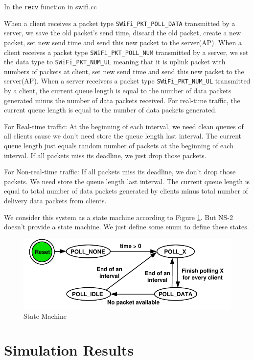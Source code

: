 \documentclass{article}
\begin{document}
In the  \lstinline |recv| function in swifi.cc

When a client receives a packet type \lstinline |SWiFi_PKT_POLL_DATA| transmitted by a server, we save the old packet's send time, discard the old packet, create a new packet, set new send time and send this new packet to the server(AP). 
When a client receives a packet type \lstinline |SWiFi_PKT_POLL_NUM| transmitted by a server, we set the data type to \lstinline |SWiFi_PKT_NUM_UL| meaning that it is uplink packet with numbers of packets at client, set new send time and send this new packet to the server(AP).
When a server receivers  a packet type \lstinline |SWiFi_PKT_NUM_UL| transmitted by a client, the current queue length is equal to the number of data packets generated minus the number of data packets received. For real-time traffic, the current queue length is equal to the number of data packets generated.  

For Real-time traffic: At the beginning of each interval, we need clean queues of all clients cause we don't need store the queue length last interval. The current queue length just equals random number of packets at the beginning of each interval. If all packets miss its deadline, we just drop those packets.

For Non-real-time traffic:  If all packets miss its deadline, we don't drop those packets. We need store the queue length last interval. The current queue length is equal to total number of data packets generated by clients minus total number of delivery data packets from clients. 

We consider this system as a state machine according to Figure \ref{state machine}. But NS-2 doesn't provide a state machine. We just define some enum to define these states. 

\begin{figure}[htbp]
\centering
\includegraphics[scale=0.8]{state_machine.pdf}
\caption{State Machine}
\label{state machine}
\end{figure}


\section{Simulation Results}
\label{section: simulation}
\end{document}
